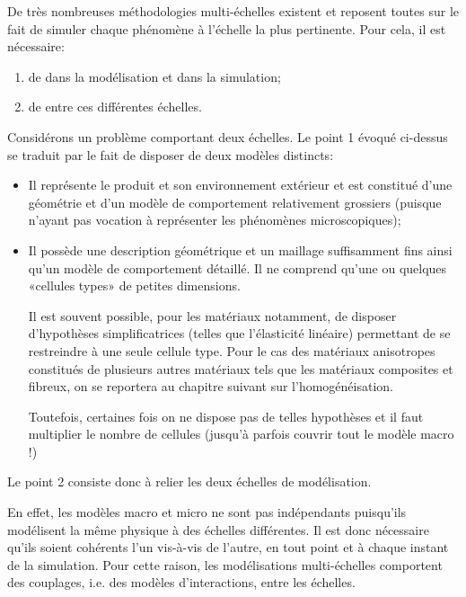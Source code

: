 \medskip
De très nombreuses méthodologies multi-échelles existent et reposent
toutes sur le fait de simuler chaque phénomène à l'échelle la plus
pertinente.
Pour cela, il est nécessaire:
\begin{enumerate}
  \item de  dans la modélisation et dans la simulation;
  \item de  entre ces différentes échelles.
\end{enumerate}

\medskip
Considérons un problème comportant deux échelles.
Le point 1 évoqué ci-dessus se traduit par le fait de disposer de deux modèles
distincts:
\begin{itemize}
  \item {}

	Il représente le produit et son environnement extérieur et est constitué
	d'une géométrie et d'un modèle de comportement relativement grossiers
	(puisque n'ayant pas vocation à représenter les phénomènes microscopiques);
  \item {}

	Il possède une description géométrique et un maillage suffisamment fins ainsi qu'un
	modèle de comportement détaillé. Il ne comprend qu'une ou quelques
	«cellules types» de petites dimensions.

	Il est souvent possible, pour les matériaux notamment, de disposer d'hypothèses
	simplificatrices (telles que l'élasticité linéaire) permettant de se restreindre à une
	seule cellule type.
	Pour le cas des matériaux anisotropes constitués de plusieurs autres matériaux tels
	que les matériaux composites et fibreux, on se reportera au chapitre suivant sur l'homogénéisation.

	Toutefois, certaines fois on ne dispose pas de telles hypothèses et il faut multiplier le nombre
	de cellules (jusqu'à parfois couvrir tout le modèle macro !)
\end{itemize}

\medskip
Le point 2 consiste donc à relier les deux échelles de modélisation.

En effet, les modèles macro et micro ne sont pas indépendants puisqu'ils
modélisent la même physique à des échelles différentes.
Il est donc nécessaire qu'ils soient cohérents l'un vis-à-vis de l'autre, en tout point et à
chaque instant de la simulation.
Pour cette raison, les modélisations multi-échelles comportent des couplages, i.e. des
modèles d'interactions, entre les échelles.

